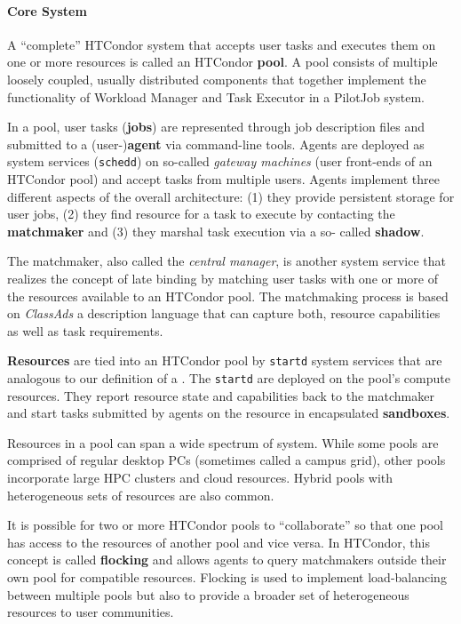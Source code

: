 \documentclass{sig-alternate}
\begin{document}
\paragraph{Core System}

A ``complete'' HTCondor system that accepts user tasks and executes them on
one or more resources is called an HTCondor \textbf{pool}. A pool consists of
multiple loosely coupled, usually distributed  components that together
implement the functionality of Workload Manager and Task Executor in a
PilotJob system.

In a pool, user tasks (\textbf{jobs}) are represented through job description
files and submitted to a (user-)\textbf{agent} via command-line tools. Agents
are deployed as system services (\texttt{schedd}) on so-called \textit{gateway
machines} (user front-ends of an HTCondor pool) and accept tasks from multiple
users. Agents implement three different aspects of the overall architecture:
(1) they provide persistent storage for user jobs, (2) they find resource for
a task to execute by contacting the \textbf{matchmaker} and (3) they marshal
task execution via a so- called \textbf{shadow}.

The matchmaker, also called the \textit{central manager}, is another system
service that realizes the concept of late binding by matching user tasks with
one or more of the resources available to an HTCondor pool. The matchmaking
process is based on \textit{ClassAds} a description language that can capture
both, resource capabilities as well as task requirements.

\textbf{Resources} are tied into an HTCondor pool by \texttt{startd} system
services that are analogous to our definition of a \pilot. The \texttt{startd}
\pilots are deployed on the pool's compute resources. They report resource
state and  capabilities back to the matchmaker and start tasks submitted by
agents on the resource in encapsulated \textbf{sandboxes}.

Resources in a pool can span a wide spectrum of system. While some pools are
comprised of regular desktop PCs (sometimes called a campus grid), other pools
incorporate large HPC clusters and cloud resources. Hybrid pools with
heterogeneous sets of resources are also common.

It is possible for two or more HTCondor pools to ``collaborate'' so that one
pool has access to the resources of another pool and vice versa. In HTCondor,
this concept is called \textbf{flocking} and allows agents to query
matchmakers outside their own pool for compatible resources. Flocking is used
to implement load-balancing between multiple pools but also to provide a
broader set of heterogeneous resources to user communities.
\end{document}
